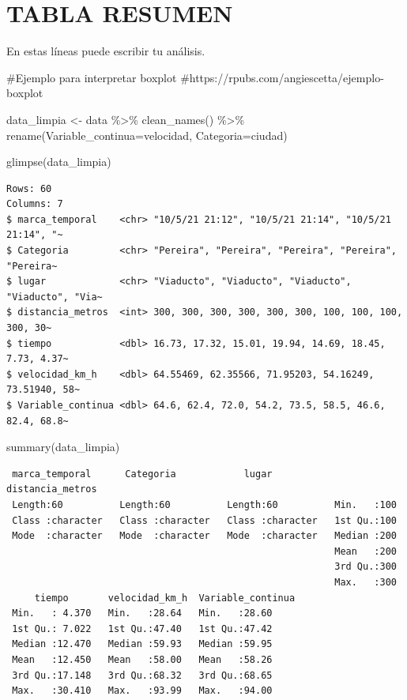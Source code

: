 \documentclass[
  letterpaper,
  DIV=11,
  numbers=noendperiod]{scrreprt}
\newenvironment{Shaded}{\begin{snugshade}}{\end{snugshade}}
\newcommand{\AttributeTok}[1]{\textcolor[rgb]{0.40,0.45,0.13}{#1}}
\newcommand{\CommentTok}[1]{\textcolor[rgb]{0.37,0.37,0.37}{#1}}
\newcommand{\FunctionTok}[1]{\textcolor[rgb]{0.28,0.35,0.67}{#1}}
\newcommand{\NormalTok}[1]{\textcolor[rgb]{0.00,0.23,0.31}{#1}}
\newcommand{\OtherTok}[1]{\textcolor[rgb]{0.00,0.23,0.31}{#1}}
\newcommand{\SpecialCharTok}[1]{\textcolor[rgb]{0.37,0.37,0.37}{#1}}
\begin{document}
\section{TABLA RESUMEN}\label{tabla-resumen}

En estas líneas puede escribir tu análisis.

\begin{Shaded}
\begin{Highlighting}[]
\CommentTok{\#Ejemplo para interpretar boxplot}
\CommentTok{\#https://rpubs.com/angiescetta/ejemplo{-}boxplot}

\NormalTok{data\_limpia }\OtherTok{\textless{}{-}}\NormalTok{ data }\SpecialCharTok{\%\textgreater{}\%} 
  \FunctionTok{clean\_names}\NormalTok{() }\SpecialCharTok{\%\textgreater{}\%} 
  \FunctionTok{rename}\NormalTok{(}\AttributeTok{Variable\_continua=}\NormalTok{velocidad,}
         \AttributeTok{Categoria=}\NormalTok{ciudad)}

\FunctionTok{glimpse}\NormalTok{(data\_limpia)}
\end{Highlighting}
\end{Shaded}

\begin{verbatim}
Rows: 60
Columns: 7
$ marca_temporal    <chr> "10/5/21 21:12", "10/5/21 21:14", "10/5/21 21:14", "~
$ Categoria         <chr> "Pereira", "Pereira", "Pereira", "Pereira", "Pereira~
$ lugar             <chr> "Viaducto", "Viaducto", "Viaducto", "Viaducto", "Via~
$ distancia_metros  <int> 300, 300, 300, 300, 300, 300, 100, 100, 100, 300, 30~
$ tiempo            <dbl> 16.73, 17.32, 15.01, 19.94, 14.69, 18.45, 7.73, 4.37~
$ velocidad_km_h    <dbl> 64.55469, 62.35566, 71.95203, 54.16249, 73.51940, 58~
$ Variable_continua <dbl> 64.6, 62.4, 72.0, 54.2, 73.5, 58.5, 46.6, 82.4, 68.8~
\end{verbatim}

\begin{Shaded}
\begin{Highlighting}[]
\FunctionTok{summary}\NormalTok{(data\_limpia)}
\end{Highlighting}
\end{Shaded}

\begin{verbatim}
 marca_temporal      Categoria            lugar           distancia_metros
 Length:60          Length:60          Length:60          Min.   :100     
 Class :character   Class :character   Class :character   1st Qu.:100     
 Mode  :character   Mode  :character   Mode  :character   Median :200     
                                                          Mean   :200     
                                                          3rd Qu.:300     
                                                          Max.   :300     
     tiempo       velocidad_km_h  Variable_continua
 Min.   : 4.370   Min.   :28.64   Min.   :28.60    
 1st Qu.: 7.022   1st Qu.:47.40   1st Qu.:47.42    
 Median :12.470   Median :59.93   Median :59.95    
 Mean   :12.450   Mean   :58.00   Mean   :58.26    
 3rd Qu.:17.148   3rd Qu.:68.32   3rd Qu.:68.65    
 Max.   :30.410   Max.   :93.99   Max.   :94.00    
\end{verbatim}
\end{document}
